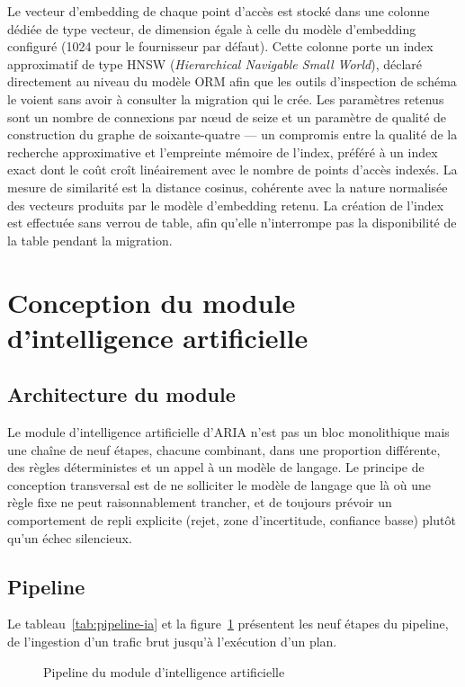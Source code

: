 Le vecteur d'embedding de chaque point d'accès est stocké dans une colonne dédiée de type vecteur, de dimension égale à celle du modèle d'embedding configuré (1024 pour le fournisseur par défaut). Cette colonne porte un index approximatif de type HNSW (\emph{Hierarchical Navigable Small World}), déclaré directement au niveau du modèle ORM afin que les outils d'inspection de schéma le voient sans avoir à consulter la migration qui le crée. Les paramètres retenus sont un nombre de connexions par nœud de seize et un paramètre de qualité de construction du graphe de soixante-quatre — un compromis entre la qualité de la recherche approximative et l'empreinte mémoire de l'index, préféré à un index exact dont le coût croît linéairement avec le nombre de points d'accès indexés. La mesure de similarité est la distance cosinus, cohérente avec la nature normalisée des vecteurs produits par le modèle d'embedding retenu. La création de l'index est effectuée sans verrou de table, afin qu'elle n'interrompe pas la disponibilité de la table pendant la migration.

\section{Conception du module d'intelligence artificielle}
\label{sec:module-ia}

\subsection{Architecture du module}

Le module d'intelligence artificielle d'ARIA n'est pas un bloc monolithique mais une chaîne de neuf étapes, chacune combinant, dans une proportion différente, des règles déterministes et un appel à un modèle de langage. Le principe de conception transversal est de ne solliciter le modèle de langage que là où une règle fixe ne peut raisonnablement trancher, et de toujours prévoir un comportement de repli explicite (rejet, zone d'incertitude, confiance basse) plutôt qu'un échec silencieux.

\subsection{Pipeline}

Le tableau~\ref{tab:pipeline-ia} et la figure~\ref{fig:pipeline-ia} présentent les neuf étapes du pipeline, de l'ingestion d'un trafic brut jusqu'à l'exécution d'un plan.

\begin{figure}[H]
  \centering
  \caption{Pipeline du module d'intelligence artificielle}
  \label{fig:pipeline-ia}
\end{figure}

